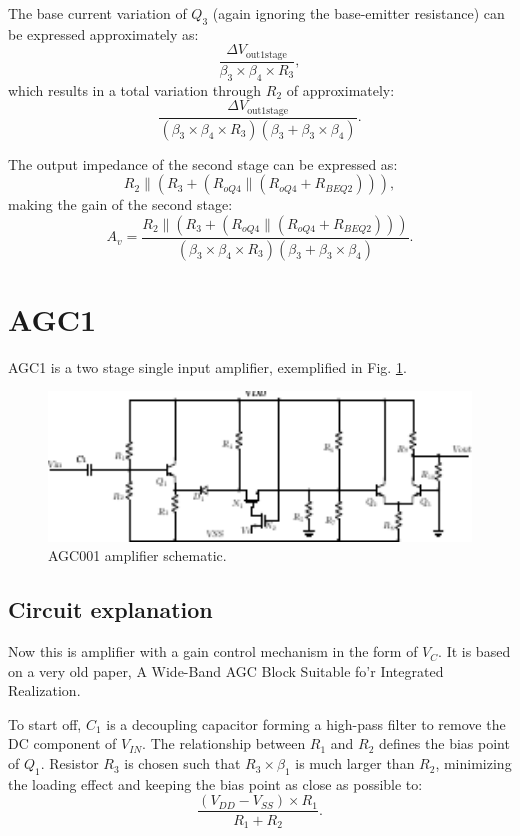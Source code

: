 \documentclass[12pt]{article}
\begin{document}
The base current variation of $Q_3$ (again ignoring the base-emitter resistance) can be expressed approximately as:  
\[
\frac{\Delta V_{\text{out1stage}}}{\beta_3 \times \beta_4 \times R_3},
\]  
which results in a total variation through $R_2$ of approximately:  
\[
\frac{\Delta V_{\text{out1stage}}}{(\beta_3 \times \beta_4 \times R_3)(\beta_3 + \beta_3 \times \beta_4)}.
\]  

The output impedance of the second stage can be expressed as:  
\[
R_2 \parallel \left(R_3 + \left(R_{oQ4} \parallel \left(R_{oQ4} + R_{BEQ2}\right)\right)\right),
\]  
making the gain of the second stage:  
\[
A_v = \frac{R_2 \parallel \left(R_3 + \left(R_{oQ4} \parallel \left(R_{oQ4} + R_{BEQ2}\right)\right)\right)}{(\beta_3 \times \beta_4 \times R_3)(\beta_3 + \beta_3 \times \beta_4)}.
\]
\newpage

\section{AGC1}

AGC1 is a  two stage single input amplifier, exemplified in Fig. \ref{audio004}. 
\begin{figure}[H]
        \centering
        \includegraphics[width=1\textwidth]{audio004.pdf}
        \caption{AGC001 amplifier schematic.}
        \label{audio004}
\end{figure}
\subsection{Circuit explanation}
Now this is amplifier with a gain control mechanism in the form of $V_C$. It is based on a very old paper, A Wide-Band AGC Block Suitable fo’r Integrated Realization. 

To start off, $C_1$ is a decoupling capacitor forming a high-pass filter to remove the DC component of $V_{IN}$. The relationship between $R_1$ and $R_2$ defines the bias point of $Q_1$. Resistor $R_3$ is chosen such that $R_3 \times \beta_1$ is much larger than $R_2$, minimizing the loading effect and keeping the bias point as close as possible to:  
\[
\frac{(V_{DD} - V_{SS}) \times R_1}{R_1 + R_2}.
\]  
\end{document}
